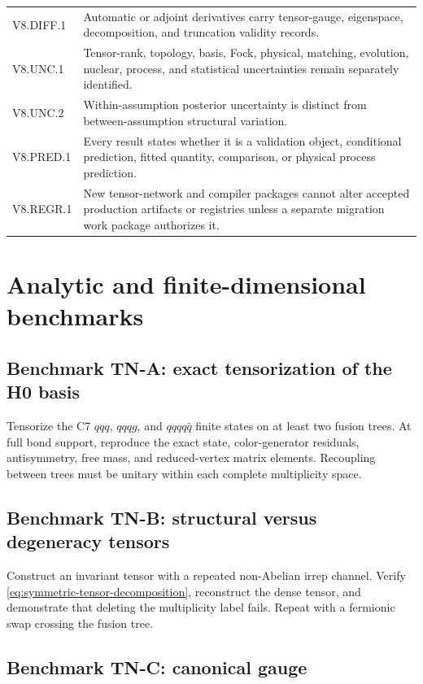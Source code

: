 \documentclass[11pt]{article}
\begin{document}
\begin{longtable}{L{0.15\textwidth}L{0.77\textwidth}}
V8.DIFF.1 & Automatic or adjoint derivatives carry tensor-gauge, eigenspace, decomposition, and truncation validity records.\\
V8.UNC.1 & Tensor-rank, topology, basis, Fock, physical, matching, evolution, nuclear, process, and statistical uncertainties remain separately identified.\\
V8.UNC.2 & Within-assumption posterior uncertainty is distinct from between-assumption structural variation.\\
V8.PRED.1 & Every result states whether it is a validation object, conditional prediction, fitted quantity, comparison, or physical process prediction.\\
V8.REGR.1 & New tensor-network and compiler packages cannot alter accepted production artifacts or registries unless a separate migration work package authorizes it.\\
\bottomrule
\end{longtable}

\section{Analytic and finite-dimensional benchmarks}
\label{sec:benchmarks}

\subsection{Benchmark TN-A: exact tensorization of the H0 basis}

Tensorize the C7 \(qqq\), \(qqqg\), and \(qqqq\bar q\) finite states on at
least two fusion trees.  At full bond support, reproduce the exact state,
color-generator residuals, antisymmetry, free mass, and reduced-vertex matrix
elements.  Recoupling between trees must be unitary within each complete
multiplicity space.

\subsection{Benchmark TN-B: structural versus degeneracy tensors}

Construct an invariant tensor with a repeated non-Abelian irrep channel.
Verify \cref{eq:symmetric-tensor-decomposition}, reconstruct the dense tensor,
and demonstrate that deleting the multiplicity label fails.  Repeat with a
fermionic swap crossing the fusion tree.

\subsection{Benchmark TN-C: canonical gauge}
\end{document}
